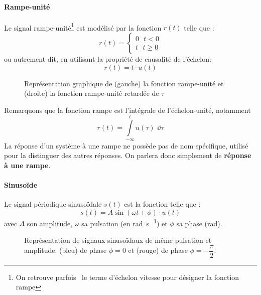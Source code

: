 \paragraph{Rampe-unité}
Le signal rampe-unité\footnote{On retrouve parfois~\cite{sueurautomatique} 
le terme d'échelon vitesse pour désigner la fonction rampe} est
modélisé par la fonction $r(t)$ telle que :
$$
r(t)=
\begin{cases}
	0\,\,\,\,t<0 \\
	t\,\,\,\,t\geq0 
\end{cases}
$$
ou autrement dit, en utilisant la propriété de causalité de l'échelon:
$$
r(t)=t\cdot u(t)
$$

\begin{figure}[!h]
\begin{center}

\end{center}
\caption{Représentation graphique de (gauche) la fonction rampe-unité et 
                                     (droite) la fonction rampe-unité retardée
                                     de $\tau$
\label{fig-rampe}}
\end{figure}
Remarquons que la fonction rampe est l'intégrale de l'échelon-unité, notamment 
$$
r(t)=\int\limits_{-\infty}^{t} u(\tau)\,\,\dd{\tau}
$$
La réponse d'un système à une rampe ne possède pas de nom spécifique, 
utilisé pour la distinguer des autres réponses. On parlera donc simplement 
de \textbf{réponse à une rampe}. 
\paragraph{Sinuso\"ide}
Le signal périodique sinuso\"idale $s(t)$ est la fonction telle que :
$$
s(t)=A\sin{(\omega t +\phi)}\cdot u(t)
$$
avec $A$ son amplitude, $\omega$ sa pulsation (en \si{\radian\per\second}) 
et $\phi$ sa phase (\si{\radian}).
\begin{figure}[!h]
\begin{center}

\end{center}
\caption{Représentation de signaux sinuso\"idaux de même pulsation 
       et amplitude. (bleu) de phase $\phi=0$ et 
       (rouge) de phase $\phi=-\dfrac{\pi}{2}$.
\label{fig-sin}}
\end{figure}

